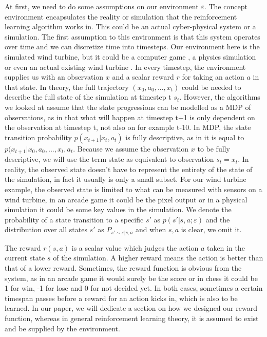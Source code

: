 \documentclass[hyperref,german,beleg]{cgvpub}
\begin{document}
At first, we need to do some assumptions on our environment $\varepsilon$. The concept environment encapsulates the reality or simulation that the reinforcement learning algorithm works in. This could be an actual cyber-physical system or a simulation. The first assumption to this environment is that this system operates over time and we can discretize time into timesteps. Our environment here is the simulated wind turbine, but it could be a computer game \cite{lillicrapCONTINUOUSCONTROLDEEP2015}, a physics simulation\cite{brockmanOpenAIGym2016} or even an actual existing wind turbine \cite{kolterDesignAnalysisLearning2012}. 
In every timestep, the environment supplies us with an observation \(x\) and a scalar reward \(r\) for taking an action \(a\) in that state. In theory, the full trajectory \((x_0, a_0, ..., x_t)\) could be needed to describe the full state of the simulation at timestep t \(s_t\). However, the algorithms we looked at assume that the state progressions can be modelled as a \ac{MDP} of observations, as in that what will happen at timestep t+1 is only dependent on the observation at timestep t, not also on for example t-10. In \ac{MDP}, the state transition probability \(p(x_{t+1}|x_t, a_t)\) is fully descriptive, as in it is equal to \(p(x_{t+1}|x_0, a_0, ..., x_t, a_t\). Because we assume the observation \(x\) to be fully descriptive, we will use the term state as equivalent to observation \(s_t = x_t\). In reality, the observed state doesn't have to represent the entirety of the state of the simulation, in fact it usually is only a small subset. For our wind turbine example, the observed state is limited to what can be measured with sensors on a wind turbine, in an arcade game it could be the pixel output or in a physical simulation it could be some key values in the simulation. We denote the probability of a state transition to a specific $s'$ as $p(s'|s,a;\varepsilon)$ and the distribution over all states $s'$ as $P_{s' \sim \varepsilon | s,a}$ and when $s,a$ is clear, we omit it.

The reward \(r(s,a)\) is a scalar value which judges the action $a$ taken in the current state $s$ of the simulation. A higher reward means the action is better than that of a lower reward. Sometimes, the reward function is obvious from the system, as in an arcade game it would surely be the score or in chess it could be 1 for win, -1 for lose and 0 for not decided yet. In both cases, sometimes a certain timespan passes before a reward for an action kicks in, which is also to be learned. In our paper, we will dedicate a section on how we designed our reward function, whereas in general reinforcement learning theory, it is assumed to exist and be supplied by the environment.
\end{document}
